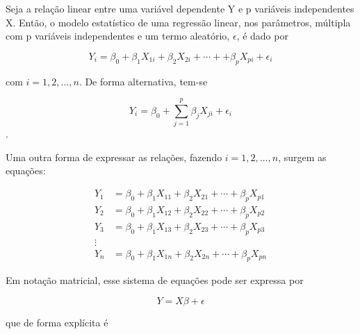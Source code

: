 \documentclass[
]{book}
\begin{document}
Seja a relação linear entre uma variável dependente Y e p variáveis independentes X. Então, o modelo estatístico de uma regressão linear, nos parâmetros, múltipla com p variáveis independentes e um termo aleatório, \(\epsilon\), é dado por

\begin{equation*}
Y_i = \beta_0 + \beta_1X_{1i} + \beta_2X_{2i} + \cdots +
+ \beta_pX_{pi} + \epsilon_i
\end{equation*}

com \(i=1,2,\ldots,n\). De forma alternativa, tem-se

\begin{equation*}
Y_i = \beta_0 + \sum_{j=1}^p\beta_j X_{ji} + \epsilon_i
\end{equation*}.

Uma outra forma de expressar as relações, fazendo \(i=1,2,\ldots, n\), surgem as equações:

\begin{align}
Y_1 &= \beta_0 + \beta_1 X_{11} + \beta_2 X_{21} + \cdots + \beta_p X_{p1}\\
Y_2 &= \beta_0 + \beta_1 X_{12} + \beta_2 X_{22} + \cdots + \beta_p X_{p2}\\
Y_3 &= \beta_0 + \beta_1 X_{13} + \beta_2 X_{23} + \cdots + \beta_p X_{p3}\\
\vdots & \\
Y_n &= \beta_0 + \beta_1 X_{1n} + \beta_2 X_{2n} + \cdots + \beta_p X_{pn}
\end{align}

Em notação matricial, esse sistema de equações pode ser expressa por

\begin{equation*}
Y = X\beta + \epsilon
\end{equation*}

que de forma explícita é
\end{document}
